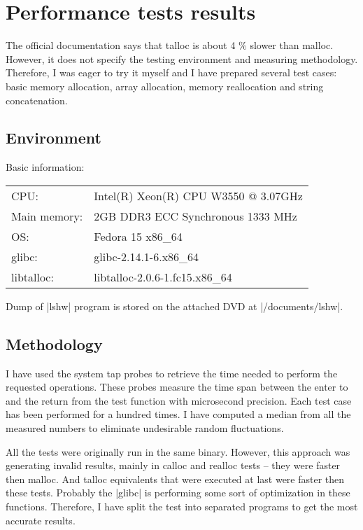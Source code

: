 \chapter{Performance tests results}

The official documentation says that talloc is about 4 \% slower than
malloc\cite{TallocDoc}. However, it does not specify the testing environment and
measuring methodology. Therefore, I was eager to try it myself and I have
prepared several test cases: basic memory allocation, array allocation, memory
reallocation and string concatenation. 

\section{Environment}

Basic information:

\begin{table}[h]
  \begin{tabular}{l l}
  CPU: & Intel(R) Xeon(R) CPU W3550  @ 3.07GHz \\
  Main memory: & 2GB DDR3 ECC Synchronous 1333 MHz \\
  OS: & Fedora 15 x86_64 \\
  glibc: & glibc-2.14.1-6.x86_64 \\
  libtalloc: & libtalloc-2.0.6-1.fc15.x86_64
  \end{tabular}
\end{table}

\noindent
Dump of |lshw| program is stored on the attached DVD at |/documents/lshw|.

\section{Methodology}

I have used the system tap probes to retrieve the time needed to perform the
requested operations. These probes measure the time span between the enter to
and the return from the test function with microsecond precision. Each test case
has been performed for a hundred times. I have computed a median from all the
measured numbers to eliminate undesirable random fluctuations.

All the tests were originally run in the same binary. However, this approach was
generating invalid results, mainly in calloc and realloc tests -- they were
faster then malloc. And talloc equivalents that were executed at last were
faster then these tests. Probably the |glibc| is performing some sort of
optimization in these functions. Therefore, I have split the test into
separated programs to get the most accurate results.

